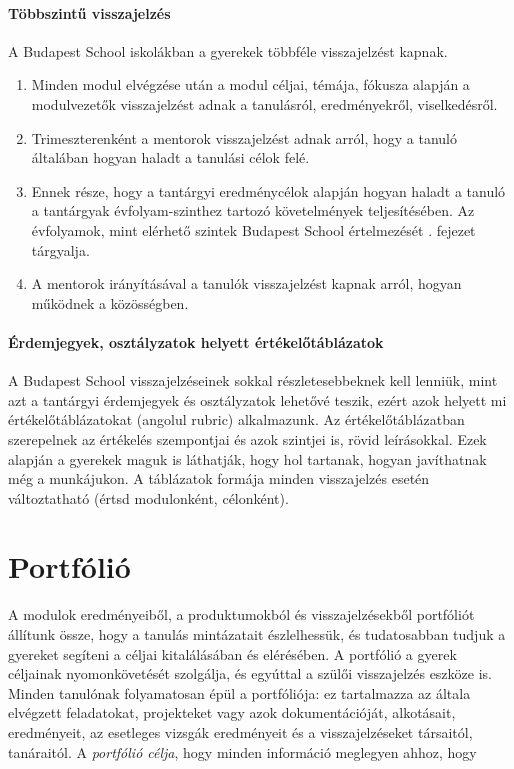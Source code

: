 \paragraph{Többszintű visszajelzés} A Budapest School iskolákban a gyerekek
többféle visszajelzést kapnak. \begin{enumerate}
  \item Minden modul elvégzése után a modul céljai, témája, fókusza alapján a
        modulvezetők visszajelzést adnak a tanulásról, eredményekről, viselkedésről.
  \item Trimeszterenként a mentorok visszajelzést adnak arról, hogy a tanuló
        általában hogyan haladt a tanulási célok felé.
  \item Ennek része, hogy a tantárgyi eredménycélok alapján hogyan haladt a
        tanuló a tantárgyak évfolyam-szinthez tartozó követelmények teljesítésében. Az
        évfolyamok, mint elérhető szintek Budapest School értelmezését
        . fejezet tárgyalja.
  \item A mentorok irányításával a tanulók visszajelzést kapnak arról, hogyan
        működnek a közösségben.
\end{enumerate}

\paragraph{Érdemjegyek, osztályzatok helyett értékelőtáblázatok} A Budapest
School visszajelzéseinek sokkal részletesebbeknek kell lenniük, mint azt a
tantárgyi érdemjegyek és osztályzatok lehetővé teszik, ezért azok helyett mi
értékelőtáblázatokat (angolul rubric) alkalmazunk. Az értékelőtáblázatban
szerepelnek az értékelés szempontjai és azok szintjei is, rövid leírásokkal.
Ezek alapján a gyerekek maguk is láthatják, hogy hol tartanak, hogyan
javíthatnak még a munkájukon. A táblázatok formája minden visszajelzés esetén
változtatható (értsd modulonként, célonként).

\section{Portfólió}

A modulok eredményeiből, a produktumokból és visszajelzésekből portfóliót
állítunk össze, hogy a tanulás mintázatait észlelhessük, és tudatosabban tudjuk
a gyereket segíteni a céljai kitalálásában és elérésében. A portfólió a gyerek
céljainak nyomonkövetését szolgálja, és egyúttal a szülői visszajelzés eszköze
is. Minden tanulónak folyamatosan épül a portfóliója: ez tartalmazza az általa
elvégzett feladatokat, projekteket vagy azok dokumentációját, alkotásait,
eredményeit, az esetleges vizsgák eredményeit és a visszajelzéseket társaitól,
tanáraitól. A \emph{portfólió célja}, hogy minden információ meglegyen ahhoz,
hogy

